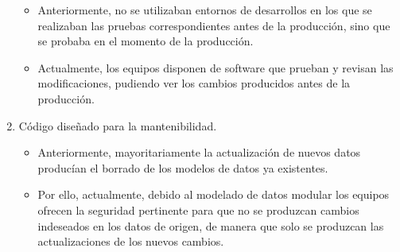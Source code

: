 \begin{enumerate}
	\begin{itemize}
    	\item Anteriormente, no se utilizaban entornos de desarrollos en los que se realizaban las pruebas correspondientes antes de la producción, sino que se probaba en el momento de la producción.
    	\item Actualmente, los equipos disponen de software que prueban y revisan las modificaciones, pudiendo ver los cambios producidos antes de la producción.
    \end{itemize}
	
	\item Código diseñado para la mantenibilidad.

	\begin{itemize}
    	\item Anteriormente, mayoritariamente la actualización de nuevos datos producían el borrado de los modelos de datos ya existentes.
    	\item Por ello, actualmente, debido al modelado de datos modular los equipos ofrecen la seguridad pertinente para que no se produzcan cambios indeseados en los datos de origen, de manera que solo se produzcan las actualizaciones de los nuevos cambios.
    \end{itemize}
	
\end{enumerate}
